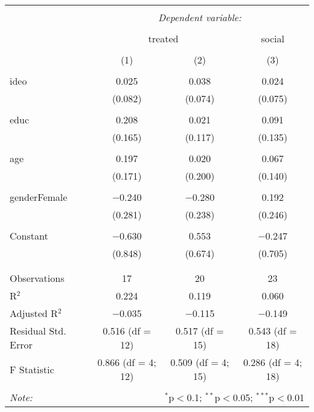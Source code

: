 
\begin{table}[!htbp] \centering 
  \caption{} 
  \label{} 
\begin{tabular}{@{\extracolsep{5pt}}lccc} 
\\[-1.8ex]\hline 
\hline \\[-1.8ex] 
 & \multicolumn{3}{c}{\textit{Dependent variable:}} \\ 
\cline{2-4} 
\\[-1.8ex] & \multicolumn{2}{c}{treated} & social \\ 
\\[-1.8ex] & (1) & (2) & (3)\\ 
\hline \\[-1.8ex] 
 ideo & 0.025 & 0.038 & 0.024 \\ 
  & (0.082) & (0.074) & (0.075) \\ 
  & & & \\ 
 educ & 0.208 & 0.021 & 0.091 \\ 
  & (0.165) & (0.117) & (0.135) \\ 
  & & & \\ 
 age & 0.197 & 0.020 & 0.067 \\ 
  & (0.171) & (0.200) & (0.140) \\ 
  & & & \\ 
 genderFemale & $-$0.240 & $-$0.280 & 0.192 \\ 
  & (0.281) & (0.238) & (0.246) \\ 
  & & & \\ 
 Constant & $-$0.630 & 0.553 & $-$0.247 \\ 
  & (0.848) & (0.674) & (0.705) \\ 
  & & & \\ 
\hline \\[-1.8ex] 
Observations & 17 & 20 & 23 \\ 
R$^{2}$ & 0.224 & 0.119 & 0.060 \\ 
Adjusted R$^{2}$ & $-$0.035 & $-$0.115 & $-$0.149 \\ 
Residual Std. Error & 0.516 (df = 12) & 0.517 (df = 15) & 0.543 (df = 18) \\ 
F Statistic & 0.866 (df = 4; 12) & 0.509 (df = 4; 15) & 0.286 (df = 4; 18) \\ 
\hline 
\hline \\[-1.8ex] 
\textit{Note:}  & \multicolumn{3}{r}{$^{*}$p$<$0.1; $^{**}$p$<$0.05; $^{***}$p$<$0.01} \\ 
\end{tabular} 
\end{table} 
